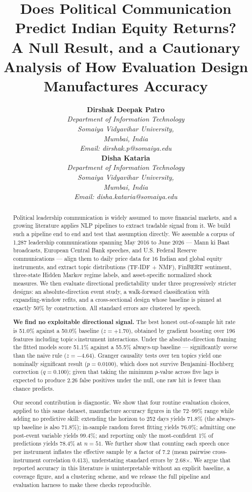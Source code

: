 \documentclass[11pt]{article}
\title{\textbf{Does Political Communication Predict Indian Equity Returns?} \\ \large A Null Result, and a Cautionary Analysis of How Evaluation Design Manufactures Accuracy}
\author{
\begin{minipage}[t]{0.45\textwidth}
\centering
\textbf{Dirshak Deepak Patro}\\[2pt]
\textit{Department of Information Technology}\\
\textit{Somaiya Vidyavihar University,}\\
\textit{Mumbai, India}\\
\textit{Email: dirshak.p@somaiya.edu}
\end{minipage}
\hfill
\begin{minipage}[t]{0.45\textwidth}
\centering
\textbf{Disha Kataria}\\[2pt]
\textit{Department of Information Technology}\\
\textit{Somaiya Vidyavihar University,}\\
\textit{Mumbai, India}\\
\textit{Email: disha.kataria@somaiya.edu}
\end{minipage}
}
\begin{document}
\maketitle

\begin{abstract}
Political leadership communication is widely assumed to move financial markets, and a growing literature applies NLP pipelines to extract tradable signal from it. We build such a pipeline end to end and test that assumption directly. We assemble a corpus of 1{,}287 leadership communications spanning May 2016 to June 2026 --- Mann ki Baat broadcasts, European Central Bank speeches, and U.S. Federal Reserve communications --- align them to daily price data for 16 Indian and global equity instruments, and extract topic distributions (TF-IDF + NMF), FinBERT sentiment, three-state Hidden Markov regime labels, and asset-specific normalized shock measures. We then evaluate directional predictability under three progressively stricter designs: an absolute-direction event study, a walk-forward classification with expanding-window refits, and a cross-sectional design whose baseline is pinned at exactly 50\% by construction. All standard errors are clustered by speech.

\textbf{We find no exploitable directional signal.} The best honest out-of-sample hit rate is 51.0\% against a 50.0\% baseline ($z=+1.70$), obtained by gradient boosting over 196 features including topic$\times$instrument interactions. Under the absolute-direction framing the fitted models score 51.1\% against a 55.5\% always-up baseline --- significantly \textit{worse} than the naive rule ($z=-4.64$). Granger causality tests over ten topics yield one nominally significant result ($p=0.0100$), which does not survive Benjamini--Hochberg correction ($q=0.100$); given that taking the minimum $p$-value across five lags is expected to produce 2.26 false positives under the null, one raw hit is fewer than chance predicts.

Our second contribution is diagnostic. We show that four routine evaluation choices, applied to this same dataset, manufacture accuracy figures in the 72--99\% range while adding no predictive skill: extending the horizon to 252 days yields 71.8\% (the always-up baseline is also 71.8\%); in-sample random forest fitting yields 76.0\%; admitting one post-event variable yields 99.4\%; and reporting only the most-confident 1\% of predictions yields 78.4\% at $n=51$. We further show that counting each speech once per instrument inflates the effective sample by a factor of 7.2 (mean pairwise cross-instrument correlation 0.413), understating standard errors by 2.68$\times$. We argue that reported accuracy in this literature is uninterpretable without an explicit baseline, a coverage figure, and a clustering scheme, and we release the full pipeline and evaluation harness to make these checks reproducible.


\end{abstract}
\end{document}
